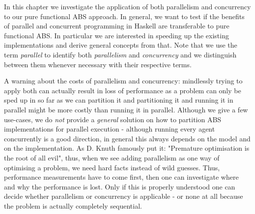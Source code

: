 In this chapter we investigate the application of both parallelism and concurrency to our pure functional ABS approach. In general, we want to test if the benefits of parallel and concurrent programming in Haskell are transferable to pure functional ABS. In particular we are interested in speeding up the existing implementations and derive general concepts from that. Note that we use the term \textit{parallel} to identify both \textit{parallelism} and \textit{concurrency} and we distinguish between them whenever necessary with their respective terms.

A warning about the costs of parallelism and concurrency: mindlessly trying to apply both can actually result in loss of performance as a problem can only be sped up in so far as we can partition it and partitioning it and running it in parallel might be more costly than running it in parallel. Although we give a few use-cases, we do \textit{not} provide a \textit{general} solution on how to partition ABS implementations for parallel execution - although running every agent concurrently is a good direction, in general this always depends on the model and on the implementation. As D. Knuth famously put it: "Premature optimisation is the root of all evil", thus, when we see adding parallelism as one way of optimising a problem, we need hard facts instead of wild guesses. Thus, performance measurements have to come first, then one can investigate where and why the performance is lost. Only if this is properly understood one can decide whether parallelism or concurrency is applicable - or none at all because the problem is actually completely sequential.





